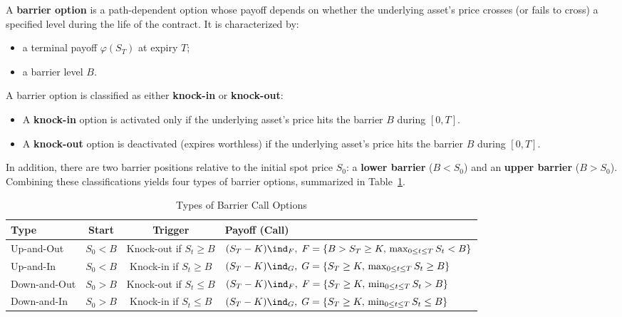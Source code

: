 \begin{definition}\label{def:barrier-option}
    A \textbf{barrier option} is a path-dependent option whose payoff depends on whether the underlying asset's price crosses (or fails to cross) a specified level during the life of the contract. It is characterized by:
    \begin{itemize}
        \item a terminal payoff $\varphi(S_T)$ at expiry $T$;
        \item a barrier level $B$.
    \end{itemize}
\end{definition}

A barrier option is classified as either \textbf{knock-in} or \textbf{knock-out}:
\begin{itemize}
    \item A \textbf{knock-in} option is activated only if the underlying asset's price hits the barrier $B$ during $[0, T]$.
    \item A \textbf{knock-out} option is deactivated (expires worthless) if the underlying asset's price hits the barrier $B$ during $[0, T]$.
\end{itemize}
In addition, there are two barrier positions relative to the initial spot price $S_0$: a \textbf{lower barrier} ($B < S_0$) and an \textbf{upper barrier} ($B > S_0$). Combining these classifications yields four types of barrier options, summarized in Table~\ref{tab:barrier-types}.

\begin{table}[!htbp]
    \centering
    \small
    \caption{Types of Barrier Call Options}\label{tab:barrier-types}
    \begin{tabular}{l c c l}
        \toprule
        \textbf{Type} & \textbf{Start} & \textbf{Trigger} & \textbf{Payoff (Call)} \\
        \midrule
        Up-and-Out   & $S_0 < B$ & Knock-out if $S_t \ge B$ & $(S_T - K)\ind_F,\; F = \{B > S_T \ge K,\, \max_{0 \le t \le T} S_t < B\}$ \\
        Up-and-In    & $S_0 < B$ & Knock-in if $S_t \ge B$  & $(S_T - K)\ind_G,\; G = \{S_T \ge K,\, \max_{0 \le t \le T} S_t \ge B\}$ \\
        Down-and-Out & $S_0 > B$ & Knock-out if $S_t \le B$ & $(S_T - K)\ind_F,\; F = \{S_T \ge K,\, \min_{0 \le t \le T} S_t > B\}$ \\
        Down-and-In  & $S_0 > B$ & Knock-in if $S_t \le B$  & $(S_T - K)\ind_G,\; G = \{S_T \ge K,\, \min_{0 \le t \le T} S_t \le B\}$ \\
        \bottomrule
    \end{tabular}
\end{table}

